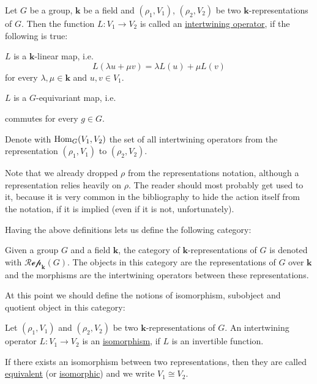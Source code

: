 \begin{definition} Let $G$ be a group, $\mathbf{k}$ be a field and $(\rho_1,V_1)$, $(\rho_2,V_2)$ be two $\mathbf{k}$-representations of $G$. Then the function $L:V_1\to V_2$ is called an \ul{intertwining operator}, if the following is true:
\begin{i_enum}
\item $L$ is a $\mathbf{k}$-linear map, i.e.
$$L(\lambda u+\mu v)=\lambda L(u)+\mu L(v)$$
for every $\lambda,\mu\in\mathbf{k}$ and $u,v\in V_1$.
\item $L$ is a $G$-equivariant map, i.e.
\begin{center}
\end{center}
commutes for every $g\in G$.
\end{i_enum}
Denote with $\mathrm{Hom}_G(V_1,V_2)$ the set of all intertwining operators from the representation $(\rho_1,V_1)$ to $(\rho_2,V_2)$.
\end{definition}

Note that we already dropped $\rho$ from the representations notation, although a representation relies heavily on $\rho$. The reader should most probably get used to it, because it is very common in the bibliography to hide the action itself from the notation, if it is implied (even if it is not, unfortunately).

Having the above definitions lets us define the following category:

\begin{definition} Given a group $G$ and a field $\mathbf{k}$, the category of $\mathbf{k}$-representations of $G$ is denoted with $\mathcal{Rep}_{\mathbf{k}}(G)$. The objects in this category are the representations of $G$ over $\mathbf{k}$ and the morphisms are the intertwining operators between these representations.
\end{definition}

At this point we should define the notions of isomorphism, subobject and quotient object in this category:

\begin{definition} Let $(\rho_1, V_1)$ and $(\rho_2, V_2)$ be two $\mathbf{k}$-representations of $G$. An intertwining operator $L:V_1\to V_2$ is an \ul{isomorphism}, if $L$ is an invertible function.

If there exists an isomorphism between two representations, then they are called \ul{equivalent} (or \ul{isomorphic}) and we write $V_1\cong V_2$.
\end{definition}

